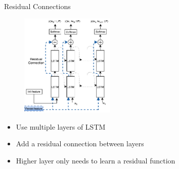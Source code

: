 \documentclass{beamer}
\begin{document}
\begin{frame}{Residual Connections}
    \begin{figure}[h]
        \centering
        \includegraphics[width=0.4\textwidth]{images/MultilayerResidualLSTM.pdf}
    \end{figure}
    \begin{itemize}
        \item Use multiple layers of LSTM 
        \item Add a residual connection between layers~\cite{He2015} 
        \item Higher layer only needs to learn a residual function 
    \end{itemize}
\end{frame}
\end{document}
